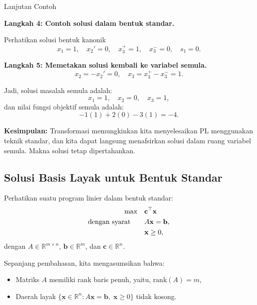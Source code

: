 \begin{example}{Lanjutan Contoh}
\medskip

\textbf{Langkah 4: Contoh solusi dalam bentuk standar.}

Perhatikan solusi bentuk kanonik
\[
x_1 = 1, \quad x_2' = 0, \quad x_3^+ = 1, \quad x_3^- = 0, \quad s_1 = 0.
\]

\textbf{Langkah 5: Memetakan solusi kembali ke variabel semula.}
\[
x_2 = -x_2' = 0, \quad x_3 = x_3^+ - x_3^- = 1.
\]

Jadi, solusi masalah semula adalah:
\[
x_1 = 1, \quad x_2 = 0, \quad x_3 = 1,
\]
dan nilai fungsi objektif semula adalah:
\[
-1(1) + 2(0) - 3(1) = -4.
\]

\medskip

\textbf{Kesimpulan:} Transformasi memungkinkan kita menyelesaikan PL menggunakan teknik standar, dan kita dapat langsung menafsirkan solusi dalam ruang variabel semula. Makna solusi tetap dipertahankan.
\end{example}

\subsection{Solusi Basis Layak untuk Bentuk Standar}

Perhatikan suatu program linier dalam bentuk standar:
\[
\begin{aligned}
\max \quad & \mathbf{c}^\top \mathbf{x} \\
\mbox{dengan syarat}\quad \quad & A \mathbf{x} = \mathbf{b}, \\
& \mathbf{x} \geq 0,
\end{aligned}
\]
dengan \( A \in \mathbb{R}^{m \times n} \), \( \mathbf{b} \in \mathbb{R}^m \), dan \( \mathbf{c} \in \mathbb{R}^n \).

\smallskip

Sepanjang pembahasan, kita mengasumsikan bahwa:
\begin{itemize}
    \item Matriks \( A \) memiliki rank baris penuh, yaitu, \( \text{rank}(A) = m \),
    \item Daerah layak \( \{ \mathbf{x} \in \mathbb{R}^n : A\mathbf{x} = \mathbf{b}, \; \mathbf{x} \geq 0 \} \) tidak kosong.
\end{itemize}

\smallskip

